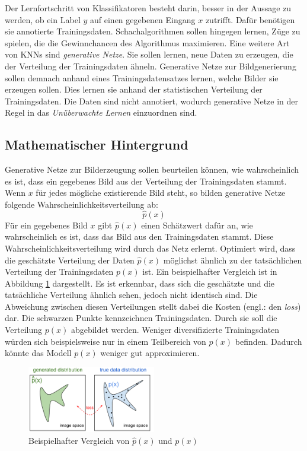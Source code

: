 Der Lernfortschritt von Klassifikatoren besteht darin, besser in der Aussage zu werden, ob ein Label $y$ auf einen gegebenen Eingang $x$ zutrifft. Dafür benötigen sie annotierte Trainingsdaten. Schachalgorithmen sollen hingegen lernen, Züge zu spielen, die die Gewinnchancen des Algorithmus maximieren. Eine weitere Art von \acp{KNN} sind \emph{generative Netze}. Sie sollen lernen, neue Daten zu erzeugen, die der Verteilung der Trainingsdaten ähneln. Generative Netze zur Bildgenerierung sollen demnach anhand eines Trainingsdatensatzes lernen, welche Bilder sie erzeugen sollen. Dies lernen sie anhand der statistischen Verteilung der Trainingsdaten. Die Daten sind nicht annotiert, wodurch generative Netze in der Regel in das \emph{Unüberwachte Lernen} einzuordnen sind.

\subsection{Mathematischer Hintergrund}
Generative Netze zur Bilderzeugung sollen beurteilen können, wie wahrscheinlich es ist, dass ein gegebenes Bild aus der Verteilung der Trainingsdaten stammt. Wenn $x$ für jedes mögliche existierende Bild steht, so bilden generative Netze folgende Wahrscheinlichkeitsverteilung ab:
\begin{equation}
   \hat{p}(x)
\end{equation}
Für ein gegebenes Bild $x$ gibt $\hat{p}(x)$ einen Schätzwert dafür an, wie wahrscheinlich es ist, dass das Bild aus den Trainingsdaten stammt. Diese Wahrscheinlichkeitsverteilung wird durch das Netz erlernt. Optimiert wird, dass die geschätzte Verteilung der Daten $\hat{p}(x)$ möglichst ähnlich zu der tatsächlichen Verteilung der Trainingsdaten $p(x)$ ist. Ein beispielhafter Vergleich ist in Abbildung \ref{fig:generativeNetsPx} dargestellt. Es ist erkennbar, dass sich die geschätzte und die tatsächliche Verteilung ähnlich sehen, jedoch nicht identisch sind. Die Abweichung zwischen diesen Verteilungen stellt dabei die Kosten (engl.: den \emph{loss}) dar. Die schwarzen Punkte kennzeichnen Trainingsdaten. Durch sie soll die Verteilung $p(x)$ abgebildet werden. Weniger diversifizierte Trainingsdaten würden sich beispielsweise nur in einem Teilbereich von $p(x)$ befinden. Dadurch könnte das Modell $p(x)$ weniger gut approximieren.

\begin{figure}[H]
   \centering
   \includegraphics[width=0.5\textwidth]{images/Generative Networks/p(x) Distribution.png}
   \caption{Beispielhafter Vergleich von $\hat{p}(x)$ und $p(x)$ \cite{openAiGenerativeNets}}
   \label{fig:generativeNetsPx}
\end{figure}

